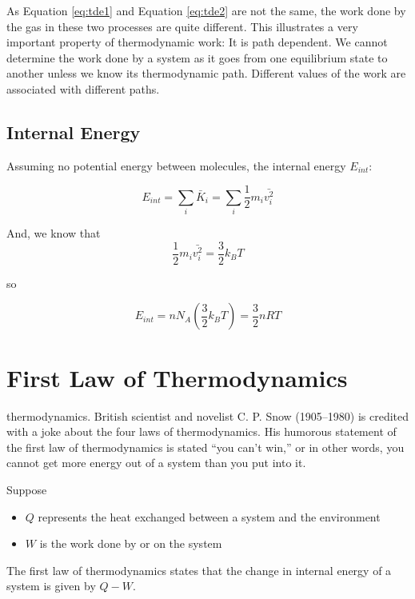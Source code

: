 \documentclass[14pt]{memoir}
\begin{document}
As Equation \ref{eq:tde1} and Equation \ref{eq:tde2} are not the same, the work done by the gas in these two processes are quite different. This illustrates a very important property of thermodynamic work: It is path dependent. We cannot determine the work done by a system as it goes from one equilibrium state to another unless we know its thermodynamic path. Different values of the work are associated with different paths.

\subsection{Internal Energy}

Assuming no potential energy between molecules, the internal energy $E_{int}$:

\begin{equation}
E_{int} = \sum_i \bar{K}_i = \sum_i \frac{1}{2} m_i \bar{v_i^2}
\end{equation}

And, we know that 
\begin{equation}
\frac{1}{2} m_i \bar{v_i^2} = \frac{3}{2} k_B T
\end{equation}

so

\begin{equation}
E_{int} = n N_A (\frac{3}{2} k_B T) = \frac{3}{2} nRT
\end{equation}



\section{First Law of Thermodynamics}

thermodynamics. British scientist and novelist C. P. Snow (1905–1980) is credited with a joke about the four laws of thermodynamics. His humorous statement of the first law of thermodynamics is stated “you can’t win,” or in other words, you cannot get more energy out of a system than you put into it.

Suppose
\begin{itemize}
\item $Q$ represents the heat exchanged between a system and the environment
\item $W$ is the work done by or on the system 
\end{itemize}

The first law of thermodynamics states that the change in internal energy of a system is given by $Q-W$. 
\end{document}

